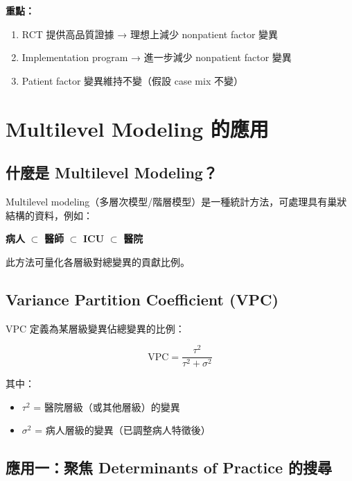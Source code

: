 \documentclass[12pt,a4paper]{article}
\begin{document}
\textbf{重點：}
\begin{enumerate}
    \item RCT 提供高品質證據 → 理想上減少 nonpatient factor 變異
    \item Implementation program → 進一步減少 nonpatient factor 變異
    \item Patient factor 變異維持不變（假設 case mix 不變）
\end{enumerate}

\section{Multilevel Modeling 的應用}

\subsection{什麼是 Multilevel Modeling？}

Multilevel modeling（多層次模型/階層模型）是一種統計方法，可處理具有巢狀結構的資料，例如：

\begin{center}
\textbf{病人} $\subset$ \textbf{醫師} $\subset$ \textbf{ICU} $\subset$ \textbf{醫院}
\end{center}

此方法可量化各層級對總變異的貢獻比例。

\subsection{Variance Partition Coefficient (VPC)}

VPC 定義為某層級變異佔總變異的比例：

\begin{equation}
\text{VPC} = \frac{\tau^2}{\tau^2 + \sigma^2}
\end{equation}

其中：
\begin{itemize}
    \item $\tau^2$ = 醫院層級（或其他層級）的變異
    \item $\sigma^2$ = 病人層級的變異（已調整病人特徵後）
\end{itemize}

\subsection{應用一：聚焦 Determinants of Practice 的搜尋}
\end{document}
